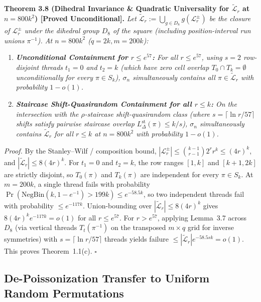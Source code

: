 \documentclass[
  11pt,
]{article}
\providecommand{\tightlist}{%
  \setlength{\itemsep}{0pt}\setlength{\parskip}{0pt}}
\begin{document}
\textbf{Theorem 3.8 (Dihedral Invariance \& Quadratic Universality for \(\widetilde{\mathcal{L}}_r\) at \(n = 800 k^2\)) [Proved Unconditional].}
\emph{Let \(\widetilde{\mathcal{L}}_r := \bigcup_{g \in D_8} g(\mathcal{L}^\pm_r)\) be the closure of \(\mathcal{L}^\pm_r\) under the dihedral group \(D_8\) of the square (including position-interval run unions \(\pi^{-1}\)). At \(n = 800 k^2\) (\(q = 2k, m = 200k\)):}
\begin{enumerate}
\def\labelenumi{\arabic{enumi}.}
\tightlist
\item \emph{\textbf{Unconditional Containment for \(r \le e^{57}\):} For all \(r \le e^{57}\), using \(s = 2\) row-disjoint threads \(t_1 = 0\) and \(t_2 = k\) (which have zero cell overlap \(T_0 \cap T_k = \emptyset\) unconditionally for every \(\pi \in S_k\)), \(\sigma_n\) simultaneously contains all \(\pi \in \widetilde{\mathcal{L}}_r\) with probability \(1 - o(1)\).}
\item \emph{\textbf{Staircase Shift-Quasirandom Containment for all \(r \le k\):} On the intersection with the \(\rho\)-staircase shift-quasirandom class (where \(s = \lceil \ln r / 57 \rceil\) shifts satisfy pairwise staircase overlap \(L^{\mathrm{st}}_\Delta(\pi) \le k/s\)), \(\sigma_n\) simultaneously contains \(\widetilde{\mathcal{L}}_r\) for all \(r \le k\) at \(n = 800 k^2\) with probability \(1 - o(1)\).}
\end{enumerate}

\emph{Proof.} By the Stanley--Wilf / composition bound, \(|\mathcal{L}^\pm_r| \le \binom{k-1}{r-1} 2^r r^k \le (4r)^k\), and \(|\widetilde{\mathcal{L}}_r| \le 8(4r)^k\). For \(t_1 = 0\) and \(t_2 = k\), the row ranges \([1, k]\) and \([k+1, 2k]\) are strictly disjoint, so \(T_0(\pi)\) and \(T_k(\pi)\) are independent for every \(\pi \in S_k\). At \(m = 200k\), a single thread fails with probability \(\Pr(\mathrm{NegBin}(k, 1-e^{-1}) > 199k) \le e^{-58.5 k}\), so two independent threads fail with probability \(\le e^{-117 k}\). Union-bounding over \(|\widetilde{\mathcal{L}}_r| \le 8(4r)^k\) gives \(8(4r)^k e^{-117 k} = o(1)\) for all \(r \le e^{57}\). For \(r > e^{57}\), applying Lemma~3.7 across \(D_8\) (via vertical threads \(T_t(\pi^{-1})\) on the transposed \(m \times q\) grid for inverse symmetries) with \(s = \lceil \ln r / 57 \rceil\) threads yields failure \(\le |\widetilde{\mathcal{L}}_r| e^{-58.5 s k} = o(1)\). This proves Theorem~1.1(c). \(\square\)

\subsection{De-Poissonization Transfer to Uniform Random Permutations}\label{de-poissonization}
\end{document}

